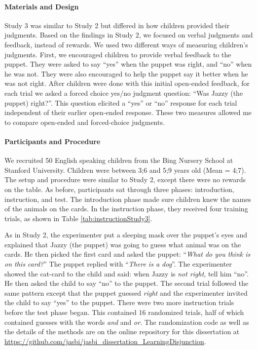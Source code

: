 \documentclass[floatsintext,man]{apa6}
\theoremstyle{definition}
\theoremstyle{definition}
\theoremstyle{definition}
\theoremstyle{remark}
\begin{document}
\paragraph{Materials and Design}\label{materials-and-design-2}

Study 3 was similar to Study 2 but differed in how children provided
their judgments. Based on the findings in Study 2, we focused on verbal
judgments and feedback, instead of rewards. We used two different ways
of measuring children's judgments. First, we encouraged children to
provide verbal feedback to the puppet. They were asked to say
\enquote{yes} when the puppet was right, and \enquote{no} when he was
not. They were also encouraged to help the puppet say it better when he
was not right. After children were done with this initial open-ended
feedback, for each trial we asked a forced choice yes/no judgment
question: \enquote{Was Jazzy (the puppet) right?}. This question
elicited a \enquote{yes} or \enquote{no} response for each trial
independent of their earlier open-ended response. These two measures
allowed me to compare open-ended and forced-choice judgments.

\paragraph{Participants and
Procedure}\label{participants-and-procedure-2}

We recruited 50 English speaking children from the Bing Nursery School
at Stanford University. Children were between 3;6 and 5;9 years old
(Mean = 4;7). The setup and procedure were similar to Study 2, except
there were no rewards on the table. As before, participants sat through
three phases: introduction, instruction, and test. The introduction
phase made sure children knew the names of the animals on the cards. In
the instruction phase, they received four training trials, as shown in
Table \ref{tab:instructionStudy3}.

As in Study 2, the experimenter put a sleeping mask over the puppet's
eyes and explained that Jazzy (the puppet) was going to guess what
animal was on the cards. He then picked the first card and asked the
puppet: \enquote{\emph{What do you think is on this card?}} The puppet
replied with \enquote{\emph{There is a dog}}. The experimenter showed
the cat-card to the child and said: when Jazzy is \emph{not right}, tell
him \enquote{no}. He then asked the child to say \enquote{no} to the
puppet. The second trial followed the same pattern except that the
puppet guessed \emph{right} and the experimenter invited the child to
say \enquote{yes} to the puppet. There were two more instruction trials
before the test phase began. This contained 16 randomized trials, half
of which contained guesses with the words \emph{and} and \emph{or}. The
randomization code as well as the details of the methods are on the
online repository for this dissertation at
\href{https://github.com/jasbi/jasbi_dissertation_LearningDisjunction/blob/master/connective_comprehension/study3/0_methods/children}{https://github.com/jasbi/jasbi\_dissertation\_LearningDisjunction}.
\end{document}
